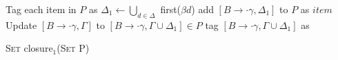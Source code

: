 \documentclass{standalone}
\begin{document}
    \begin{algorithm}[H]
        \label{alg:lr1-closure}
        \DontPrintSemicolon

        

        Tag each item in \(P\) as \UnMk \;
         {
            \;
             {
                \(\Delta_1 \leftarrow \bigcup_{d \in \Delta}\) first(\(\beta d\)) \;
                 {
                     {
                        add \([B \to \cdot \gamma, \Delta_1]\) to \(P\) as \UnMk \(item\)\;
                    }
                    {
                         {
                            Update \([B \to \cdot \gamma, \Gamma]\) to \([B \to \cdot \gamma, \Gamma \cup \Delta_1] \in P\) \;
                            tag \([B \to \cdot \gamma, \Gamma \cup \Delta_1]\) as \UnMk \;
                        }
                    }
                }
            }
        }

        \caption{\textsc{Set} closure\(_1\)(\textsc{Set} P)}
    \end{algorithm}
\end{document}
